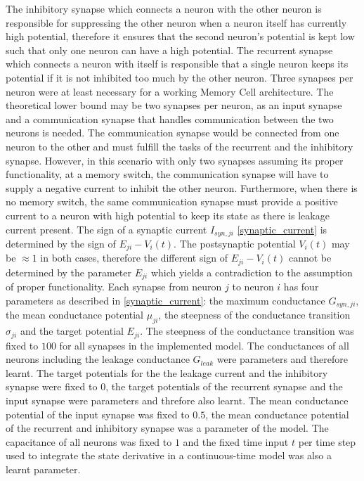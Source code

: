 \documentclass[draft,final]{vutinfth} %
\begin{document}
    The inhibitory synapse which connects a neuron with the other neuron is responsible for suppressing the other neuron when a neuron itself has currently high potential, therefore it ensures that the second neuron's potential is kept low such that only one neuron can have a high potential.
    The recurrent synapse which connects a neuron with itself is responsible that a single neuron keeps its potential if it is not inhibited too much by the other neuron.
    Three synapses per neuron were at least necessary for a working Memory Cell architecture.
    The theoretical lower bound may be two synapses per neuron, as an input synapse and a communication synapse that handles communication between the two neurons is needed.
    The communication synapse would be connected from one neuron to the other and must fulfill the tasks of the recurrent and the inhibitory synapse.
    However, in this scenario with only two synapses assuming its proper functionality, at a memory switch, the communication synapse will have to supply a negative current to inhibit the other neuron.
    Furthermore, when there is no memory switch, the same communication synapse must provide a positive current to a neuron with high potential to keep its state as there is leakage current present.
    The sign of a synaptic current $I_{syn,ji}$ \ref{synaptic_current} is determined by the sign of $E_{ji} - V_i(t)$. 
    The postsynaptic potential $V_i(t)$ may be $\approx 1$ in both cases, therefore the different sign of $E_{ji} - V_i(t)$ cannot be determined by the parameter $E_{ji}$ which yields a contradiction to the assumption of proper functionality.
    Each synapse from neuron $j$ to neuron $i$ has four parameters as described in \ref{synaptic_current}: the maximum conductance $G_{syn,ji}$, the mean conductance potential $\mu_{ji}$, the steepness of the conductance transition $\sigma_{ji}$ and the target potential $E_{ji}$.
    The steepness of the conductance transition was fixed to $100$ for all synapses in the implemented model.
    The conductances of all neurons including the leakage conductance $G_{leak}$ were parameters and therefore learnt.
    The target potentials for the the leakage current and the inhibitory synapse were fixed to $0$, the target potentials of the recurrent synapse and the input synapse were parameters and threfore also learnt.
    The mean conductance potential of the input synapse was fixed to $0.5$, the mean conductance potential of the recurrent and inhibitory synapse was a parameter of the model.
    The capacitance of all neurons was fixed to $1$ and the fixed time input $t$ per time step used to integrate the state derivative in a continuous-time model was also a learnt parameter.
\end{document}
